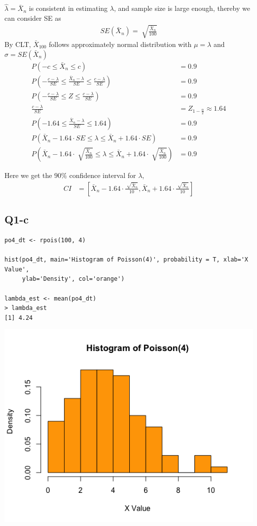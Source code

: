 \documentclass[12pt,letterpaper]{article}
\let\hat\widehat
\begin{document}
\noindent $\hat{\lambda} = \bar{X}_n$ is consistent in estimating $\lambda$, and sample size is large enough, thereby we can consider SE as 
\begin{align*}
SE(\bar{X}_n) = \sqrt[]{\frac{\bar{X}_n}{100}}
\end{align*}
\noindent By CLT, $\bar{X}_100$ follows approximately normal distribution with $\mu = \lambda$ and $\sigma = SE(\bar{X}_n)$
\begin{align*}
P(-c \leq \bar{X}_n \leq c) &= 0.9 \\
P(-\frac{c - \lambda}{SE} \leq \frac{\bar{X}_n - \lambda}{SE} \leq  \frac{c - \lambda}{SE}) &= 0.9 \\
P(-\frac{c - \lambda}{SE} \leq  Z  \leq  \frac{c - \lambda}{SE}) &= 0.9 \\
\frac{c - \lambda}{SE} &= Z_{1-\frac{\alpha}{2}} \approx 1.64 \\
P(-1.64 \leq \frac{\bar{X}_n - \lambda}{SE} \leq 1.64) &= 0.9 \\
P(\bar{X}_n -1.64 \cdot SE \leq \lambda \leq \bar{X}_n + 1.64 \cdot SE) &= 0.9 \\
P(\bar{X}_n - 1.64 \cdot \sqrt[]{\frac{\bar{X}_n}{100}} \leq \lambda \leq \bar{X}_n + 1.64 \cdot \sqrt[]{\frac{\bar{X}_n}{100}}) &= 0.9
\end{align*}

\noindent Here we get the $90 \%$ confidence interval for $\lambda$, 
\begin{align*}
CI & = [\bar{X}_n - 1.64 \cdot \frac{\sqrt[]{\bar{X}_n}}{10}, \bar{X}_n + 1.64 \cdot \frac{\sqrt[]{\bar{X}_n}}{10} ]
\end{align*}

\newpage
\subsection*{Q1-c}
\begin{verbatim}
po4_dt <- rpois(100, 4)

hist(po4_dt, main='Histogram of Poisson(4)', probability = T, xlab='X Value', 
     ylab='Density', col='orange')

lambda_est <- mean(po4_dt)
> lambda_est
[1] 4.24
\end{verbatim}

\includegraphics[width=150mm]{hist_po4.png}
\end{document}
